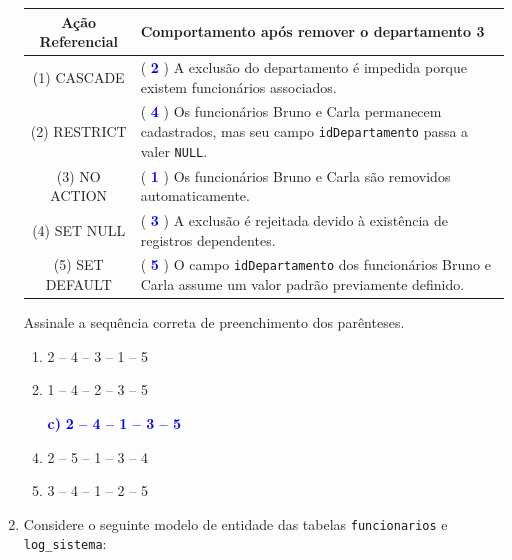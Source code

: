 \documentclass[12pt,a4paper]{article}
\begin{document}
\begin{enumerate}
\begin{center}
\begin{tabular}{|c|p{8cm}|}
\hline
\textbf{Ação Referencial} & \textbf{Comportamento após remover o departamento 3} \\
\hline
(1) CASCADE & ( \textcolor{blue}{\textbf{2}} ) A exclusão do departamento é impedida porque existem funcionários associados. \\
\hline
(2) RESTRICT & ( \textcolor{blue}{\textbf{4}} ) Os funcionários Bruno e Carla permanecem cadastrados, mas seu campo \texttt{idDepartamento} passa a valer \texttt{NULL}. \\
\hline
(3) NO ACTION & ( \textcolor{blue}{\textbf{1}} ) Os funcionários Bruno e Carla são removidos automaticamente. \\
\hline
(4) SET NULL & ( \textcolor{blue}{\textbf{3}} ) A exclusão é rejeitada devido à existência de registros dependentes. \\
\hline
(5) SET DEFAULT & ( \textcolor{blue}{\textbf{5}} ) O campo \texttt{idDepartamento} dos funcionários Bruno e Carla assume um valor padrão previamente definido. \\
\hline
\end{tabular}
\end{center}

Assinale a sequência correta de preenchimento dos parênteses.

\begin{enumerate}[label=\alph*)]
    \item 2 -- 4 -- 3 -- 1 -- 5
    \item 1 -- 4 -- 2 -- 3 -- 5
    \item[\textbf{\textcolor{blue}{c)}}] \textcolor{blue}{\textbf{2 -- 4 -- 1 -- 3 -- 5}}
\item 2 -- 5 -- 1 -- 3 -- 4
\item 3 -- 4 -- 1 -- 2 -- 5
\end{enumerate}

    \vspace{0.5cm}

    \item  Considere o seguinte modelo de entidade das tabelas \texttt{funcionarios} e \texttt{log\_sistema}:
    
    \vspace{0.3cm}
    \begin{center}
\end{center}
\end{enumerate}
\end{document}
